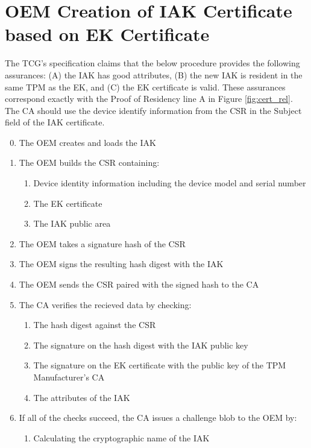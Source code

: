 \newpage
\section{OEM Creation of IAK Certificate based on EK Certificate}
The TCG's specification claims that the below procedure provides the following assurances: (A) the IAK has good attributes, (B) the new IAK is resident in the same TPM as the EK, and (C) the EK certificate is valid. These assurances correspond exactly with the Proof of Residency line A in Figure \ref{fig:cert_rel}. The CA should use the device identify information from the CSR in the Subject field of the IAK certificate.
\begin{enumerate}[itemsep=0pt,parsep=0pt,partopsep=0pt]
  \setcounter{enumi}{-1}
  \item The OEM creates and loads the IAK
  \item The OEM builds the CSR containing:
  \begin{enumerate}[topsep=0pt, itemsep=0pt,parsep=0pt,partopsep=0pt]
    \item Device identity information including the device model and serial
    number
    \item The EK certificate
    \item The IAK public area
  \end{enumerate}
  \item The OEM takes a signature hash of the CSR
  \item The OEM signs the resulting hash digest with the IAK
  \item The OEM sends the CSR paired with the signed hash to the CA
  \item The CA verifies the recieved data by checking:
  \begin{enumerate}[topsep=0pt, itemsep=0pt,parsep=0pt,partopsep=0pt]
    \item The hash digest against the CSR
    \item The signature on the hash digest with the IAK public key
    \item The signature on the EK certificate with the public key of the TPM Manufacturer's CA
    \item The attributes of the IAK
  \end{enumerate}
  \item If all of the checks succeed, the CA issues a challenge blob to the OEM by:
  \begin{enumerate}[topsep=0pt, itemsep=0pt,parsep=0pt,partopsep=0pt]
    \item Calculating the cryptographic name of the IAK

\end{enumerate}
\end{enumerate}
